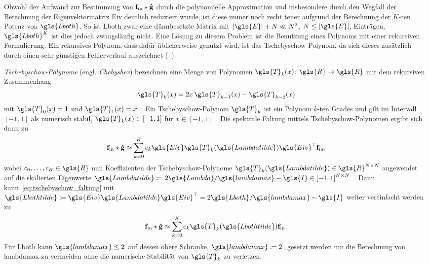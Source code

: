 Obwohl der Aufwand zur Bestimmung von $\mathbf{f}_{\mathrm{in}} \star \mathbf{\hat g}$ durch die polynomielle Approximation und insbesondere durch den Wegfall der Berechnung der Eigenvektormatrix \gls{Eiv} deutlich reduziert wurde, ist diese immer noch recht teuer aufgrund der Berechnung der $K$-ten Potenz von $\gls{Lboth}$.
So ist \gls{Lboth} zwar eine dünnbesetzte Matrix mit $\left|\gls{E}\right| + N \ll N^2$, $N \leq \left|\gls{E}\right|$, Einträgen, $\gls{Lboth}^K$ ist dies jedoch zwangsläufig nicht.
Eine Lösung zu diesem Problem ist die Benutzung eines Polynoms mit einer rekursiven Formulierung.
Ein rekursives Polynom, dass dafür üblicherweise genutzt wird, ist das Tschebyschow-Polynom, da sich dieses zusätzlich durch einen sehr günstigen Fehlerverlauf auszeichnet (\vgl{}~\cite{Hammond}).

\emph{Tschebyschow-Polynome} (engl. \emph{Chebyshev}) bezeichnen eine Menge von Polynomen $\gls{T}_k\left(x\right) \colon \gls{R} \to \gls{R}$ mit dem rekursiven Zusammenhang
\begin{equation*}
  \gls{T}_k\left(x\right) = 2x\, \gls{T}_{k-1}\left(x\right) - \gls{T}_{k-2}\left(x\right)
\end{equation*}
mit $\gls{T}_0\left(x\right) = 1$ und $\gls{T}_1\left(x\right) = x$~\cite{Hammond}.
Ein Tschebyschow-Polynom $\gls{T}_k$ ist ein Polynom $k$-ten Grades und gilt im Intervall $\left[-1, 1\right]$ als numerisch stabil, \dhe{} $\gls{T}_k\left(x\right) \in \left[-1, 1\right]$ für $x \in \left[-1, 1\right]$~\cite{Hammond}.
Die spektrale Faltung mittels Tschebyschow-Polynomen ergibt sich dann zu
\begin{equation}
  \ve{f}_{\mathrm{in}} \star \ve{\hat g} \approx \sum_{k=0}^K c_k\gls{Eiv}\gls{T}_k\left(\gls{Lambdatilde}\right)\gls{Eiv}^{\top}\ve{f}_{\mathrm{in}},
  \label{eq:tschebyschow_faltung}
\end{equation}
wobei $c_0, \ldots, c_K \in \gls{R}$ nun Koeffizienten der Tschebyschow-Polynome $\gls{T}_k\left(\gls{Lambdatilde}\right) \in \gls{R}^{N \times N}$ angewendet auf die skalierten Eigenwerte $\gls{Lambdatilde} \coloneqq 2\gls{Lambda}/\gls{lambdamax} - \gls{I} \in {\left[-1, 1\right]}^{N \times N}$~\cite{Defferrard}.
Dann kann~\eqref{eq:tschebyschow_faltung} mit $\gls{Lbothtilde} \coloneqq \gls{Eiv}\gls{Lambdatilde}\gls{Eiv}^{\top} = 2\gls{Lboth}/\gls{lambdamax} - \gls{I}$ weiter vereinfacht werden zu~\cite{Defferrard}
\begin{equation*}
  \ve{f}_{\mathrm{in}} \star \ve{\hat g} \approx \sum_{k=0}^K c_k\gls{T}_k\left(\gls{Lbothtilde}\right)\ve{f}_{\mathrm{in}}.
\end{equation*}
Für \gls{Lboth} kann $\gls{lambdamax} \leq 2$ auf dessen obere Schranke, \dhe{} $\gls{lambdamax} \coloneqq 2$, gesetzt werden um die Berechnung von \gls{lambdamax} zu vermeiden ohne die numerische Stabilität von $\gls{T}_k$ zu verletzen.

